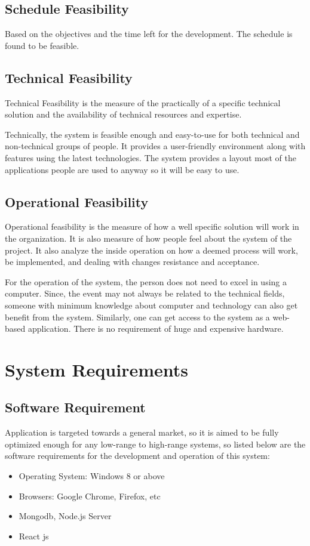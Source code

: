 \subsection{Schedule Feasibility}
Based on the objectives and the time left for the development.
The schedule is found to be feasible.

\subsection{Technical Feasibility}
Technical Feasibility is the measure of the practically of a specific technical solution and the availability of technical resources and expertise.\par
Technically, the system is feasible enough and easy-to-use
for both technical and non-technical groups of people. It provides
a user-friendly environment along with features using the latest technologies.
The system provides a layout most of the applications people are used to anyway
so it will be easy to use.

\subsection{Operational Feasibility}
Operational feasibility is the measure of how a well specific solution will work in the organization.
It is also measure of how people feel about the system of the project. It also analyze the inside operation on how a deemed process
will work, be implemented, and dealing with changes resistance and acceptance.\par
For the operation of the system, the person does
not need to excel in using a computer. Since, the event
may not always be related to the technical fields, someone
with minimum knowledge about computer and technology can also get
benefit from the system. Similarly, one can get access to the system
as a web-based application. There is no requirement of huge and expensive hardware.

\section{System Requirements}

\subsection{Software Requirement}
Application is targeted towards a general market,
so it is aimed to be fully optimized enough for any low-range to
high-range systems, so listed below are
the software requirements for the development and operation of this system:
\vspace{-18pt}
\begin{itemize}
	\item Operating System: Windows 8 or above
	\item Browsers: Google Chrome, Firefox, etc
	\item Mongodb, Node.js Server
	\item React js
\end{itemize}

